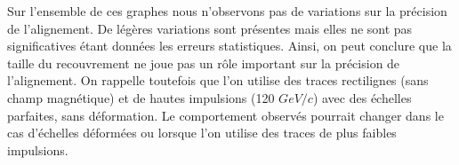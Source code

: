    \medskip
   
   Sur l'ensemble de ces graphes nous n'observons pas de variations sur la pr\'ecision de l'alignement. De l\'eg\`eres variations sont pr\'esentes mais elles ne sont pas significatives \'etant donn\'ees les erreurs statistiques. Ainsi, on peut conclure que la taille du recouvrement ne joue pas un r\^ole important sur la pr\'ecision de l'alignement. On rappelle toutefois que l'on utilise des traces rectilignes (sans champ magn\'etique) et de hautes impulsions (120 $GeV/c$) avec des \'echelles parfaites, sans d\'eformation. Le comportement observ\'es pourrait changer dans le cas d'\'echelles d\'eform\'ees ou lorsque l'on utilise des traces de plus faibles impulsions.

    \begin{figure}[htb!]
       \centering
\end{figure}
